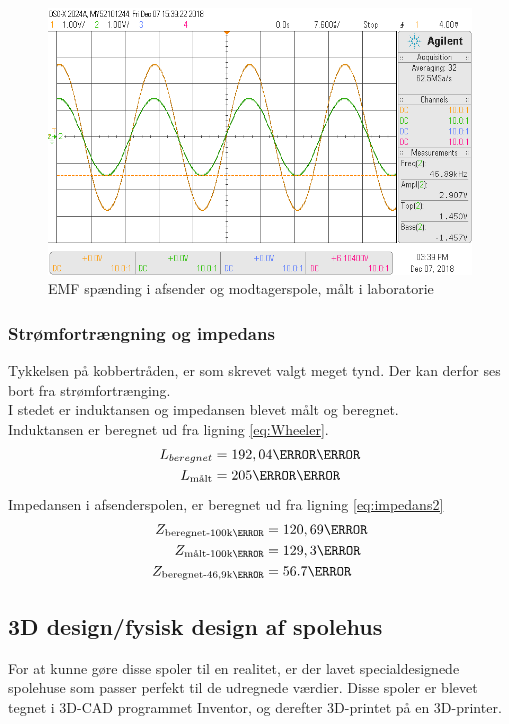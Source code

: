 \begin{figure}[h!]
	\centering
	\includegraphics[width=1\textwidth]{billeder/vin_vout_png.png}
	\caption{EMF spænding i afsender og modtagerspole, målt i laboratorie}
	\label{fig:EMF_spole_lab}
\end{figure}
\newpage
\subsubsection{Strømfortrængning og impedans}
Tykkelsen på kobbertråden, er som skrevet valgt meget tynd.
Der kan derfor ses bort fra strømfortrænging.\\
I stedet er induktansen og impedansen blevet målt og beregnet.\\
Induktansen er beregnet ud fra ligning \ref{eq:Wheeler}.
\begin{align}
	 L_{beregnet} &= 192,04\micro\henry\nonumber\\
     L_{\text{målt}} &= 205\micro\henry\nonumber
\end{align}
Impedansen i afsenderspolen, er beregnet ud fra ligning \ref{eq:impedans2}
\begin{align}
	 Z_{\text{beregnet-100k\hertz}}&=120,69\ohm\nonumber\\
	 Z_{\text{målt-100k\hertz}}&=129,3\ohm\nonumber\\
	 Z_{\text{beregnet-46,9k\hertz}}&= 56.7\ohm\nonumber               
\end{align}
\subsection{3D design/fysisk design af spolehus}\label{sec:3D_design}
For at kunne gøre disse spoler til en realitet, er der lavet specialdesignede spolehuse som passer perfekt til de udregnede værdier. Disse spoler er blevet tegnet i 3D-CAD programmet Inventor, og derefter 3D-printet på en 3D-printer. \\

